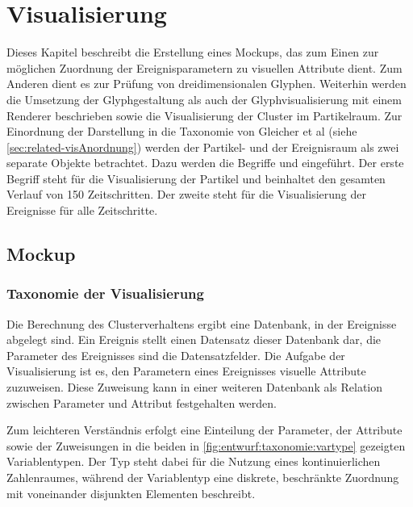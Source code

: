 

\chapter{Visualisierung}\label{sec:visualisierung}

Dieses Kapitel beschreibt die Erstellung eines Mockups, das zum Einen zur möglichen Zuordnung der Ereignisparametern zu visuellen Attribute dient. Zum Anderen dient es zur Prüfung von dreidimensionalen Glyphen. Weiterhin werden die Umsetzung der Glyphgestaltung als auch der Glyphvisualisierung mit einem Renderer beschrieben sowie die Visualisierung der Cluster im Partikelraum.
Zur Einordnung der Darstellung in die Taxonomie von Gleicher et al (siehe \autoref{sec:related-visAnordnung}) werden der Partikel- und der Ereignisraum als zwei separate Objekte betrachtet. Dazu werden die Begriffe  und  eingeführt. Der erste Begriff steht für die Visualisierung der Partikel und beinhaltet den gesamten Verlauf von 150 Zeitschritten. Der zweite steht für die Visualisierung der Ereignisse für alle Zeitschritte.  %


\section{Mockup}%

\subsection{Taxonomie der Visualisierung}\label{sec:vis-taxonomie}
Die Berechnung des Clusterverhaltens ergibt eine Datenbank, in der Ereignisse abgelegt sind. Ein Ereignis stellt einen Datensatz dieser Datenbank dar, die Parameter des Ereignisses sind die Datensatzfelder. Die Aufgabe der Visualisierung ist es, den Parametern eines Ereignisses visuelle Attribute zuzuweisen. Diese Zuweisung kann in einer weiteren Datenbank als Relation %
zwischen Parameter und Attribut festgehalten werden.

Zum leichteren Verständnis erfolgt eine Einteilung der Parameter, der Attribute sowie der Zuweisungen in die beiden in \autoref{fig:entwurf:taxonomie:vartype} gezeigten Variablentypen. Der Typ  steht dabei für die Nutzung eines kontinuierlichen Zahlenraumes, während der Variablentyp  eine diskrete, beschränkte Zuordnung mit voneinander disjunkten Elementen beschreibt.

